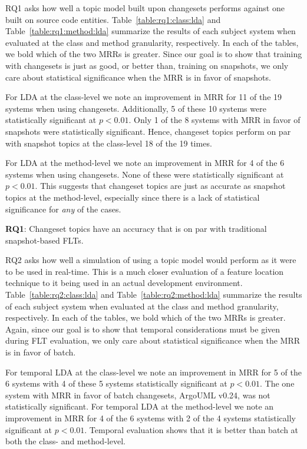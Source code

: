 RQ1 asks how well a topic model built upon changesets performs against
one built on source code entities.
Table~\ref{table:rq1:class:lda} and Table~\ref{table:rq1:method:lda}
summarize the results of each subject system when
evaluated at the class and method granularity, respectively.
In each of the tables, we bold which of the two MRRs is greater.
Since our goal is to show that training with changesets is just as good, or
better than, training on snapshots, we only care about statistical significance
when the MRR is in favor of snapshots.

For LDA at the class-level we note an improvement in MRR for 11 of the 19 systems when using changesets.
Additionally, 5 of these 10 systems were statistically significant at $p<0.01$.
Only 1 of the 8 systems with MRR in favor of snapshots were statistically significant.
Hence, changeset topics perform on par with snapshot topics at the class-level 18 of the 19 times.

For LDA at the method-level we note an improvement in MRR for 4 of the 6 systems when using changesets.
None of these were statistically significant at $p<0.01$.
This suggests that changeset topics are just as accurate as snapshot topics at the method-level,
especially since there is a lack of statistical significance for \emph{any} of the cases.

\begin{framed}
    \textbf{RQ1}:
    Changeset topics have an accuracy that is on par with traditional snapshot-based FLTs.
\end{framed}



RQ2 asks how well a simulation of using a topic model would perform as it were to be used in real-time.
This is a much closer evaluation of a feature location technique to it being used in an actual development environment.
Table~\ref{table:rq2:class:lda} and Table~\ref{table:rq2:method:lda}
summarize the results of each subject system when
evaluated at the class and method granularity, respectively.
In each of the tables, we bold which of the two MRRs is greater.
Again, since our goal is to show that temporal considerations must be given
during FLT evaluation, we only care about statistical significance when the MRR
is in favor of batch.

For temporal LDA at the class-level we note an improvement in MRR for 5 of the 6 systems
with 4 of these 5 systems statistically significant at $p<0.01$.
The one system with MRR in favor of batch changesets, ArgoUML v0.24, was not statistically significant.
For temporal LDA at the method-level we note an improvement in MRR for 4 of the 6 systems
with 2 of the 4 systems statistically significant at $p<0.01$.
Temporal evaluation shows that it is better than batch at both the class- and method-level.

